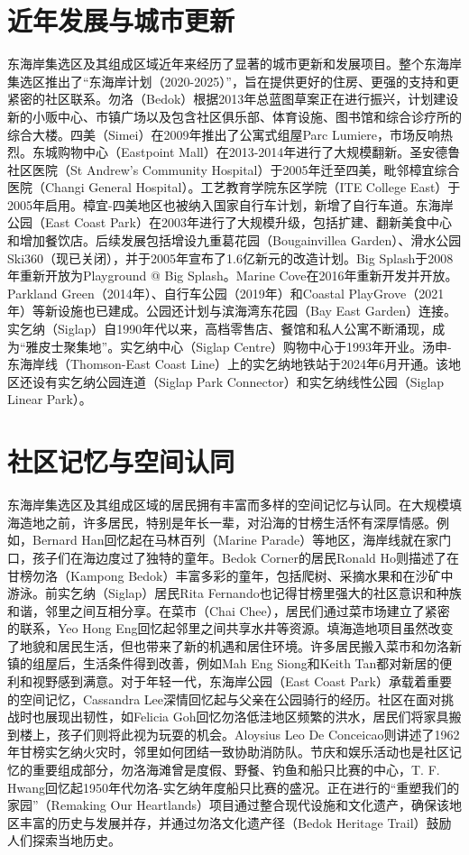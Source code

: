 \documentclass[11pt,a4paper,twoside,openany]{book}
\begin{document}
\section{近年发展与城市更新}
东海岸集选区及其组成区域近年来经历了显著的城市更新和发展项目。整个东海岸集选区推出了“东海岸计划（2020-2025）”，旨在提供更好的住房、更强的支持和更紧密的社区联系。勿洛（Bedok）根据2013年总蓝图草案正在进行振兴，计划建设新的小贩中心、市镇广场以及包含社区俱乐部、体育设施、图书馆和综合诊疗所的综合大楼。四美（Simei）在2009年推出了公寓式组屋Parc Lumiere，市场反响热烈。东城购物中心（Eastpoint Mall）在2013-2014年进行了大规模翻新。圣安德鲁社区医院（St Andrew’s Community Hospital）于2005年迁至四美，毗邻樟宜综合医院（Changi General Hospital）。工艺教育学院东区学院（ITE College East）于2005年启用。樟宜-四美地区也被纳入国家自行车计划，新增了自行车道。东海岸公园（East Coast Park）在2003年进行了大规模升级，包括扩建、翻新美食中心和增加餐饮店。后续发展包括增设九重葛花园（Bougainvillea Garden）、滑水公园Ski360（现已关闭），并于2005年宣布了1.6亿新元的改造计划。Big Splash于2008年重新开放为Playground @ Big Splash。Marine Cove在2016年重新开发并开放。Parkland Green（2014年）、自行车公园（2019年）和Coastal PlayGrove（2021年）等新设施也已建成。公园还计划与滨海湾东花园（Bay East Garden）连接。实乞纳（Siglap）自1990年代以来，高档零售店、餐馆和私人公寓不断涌现，成为“雅皮士聚集地”。实乞纳中心（Siglap Centre）购物中心于1993年开业。汤申-东海岸线（Thomson-East Coast Line）上的实乞纳地铁站于2024年6月开通。该地区还设有实乞纳公园连道（Siglap Park Connector）和实乞纳线性公园（Siglap Linear Park）。

\section{社区记忆与空间认同}
东海岸集选区及其组成区域的居民拥有丰富而多样的空间记忆与认同。在大规模填海造地之前，许多居民，特别是年长一辈，对沿海的甘榜生活怀有深厚情感。例如，Bernard Han回忆起在马林百列（Marine Parade）等地区，海岸线就在家门口，孩子们在海边度过了独特的童年。Bedok Corner的居民Ronald Ho则描述了在甘榜勿洛（Kampong Bedok）丰富多彩的童年，包括爬树、采摘水果和在沙矿中游泳。前实乞纳（Siglap）居民Rita Fernando也记得甘榜里强大的社区意识和种族和谐，邻里之间互相分享。在菜市（Chai Chee），居民们通过菜市场建立了紧密的联系，Yeo Hong Eng回忆起邻里之间共享水井等资源。填海造地项目虽然改变了地貌和居民生活，但也带来了新的机遇和居住环境。许多居民搬入菜市和勿洛新镇的组屋后，生活条件得到改善，例如Mah Eng Siong和Keith Tan都对新居的便利和视野感到满意。对于年轻一代，东海岸公园（East Coast Park）承载着重要的空间记忆，Cassandra Lee深情回忆起与父亲在公园骑行的经历。社区在面对挑战时也展现出韧性，如Felicia Goh回忆勿洛低洼地区频繁的洪水，居民们将家具搬到楼上，孩子们则将此视为玩耍的机会。Aloysius Leo De Conceicao则讲述了1962年甘榜实乞纳火灾时，邻里如何团结一致协助消防队。节庆和娱乐活动也是社区记忆的重要组成部分，勿洛海滩曾是度假、野餐、钓鱼和船只比赛的中心，T. F. Hwang回忆起1950年代勿洛-实乞纳年度船只比赛的盛况。正在进行的“重塑我们的家园”（Remaking Our Heartlands）项目通过整合现代设施和文化遗产，确保该地区丰富的历史与发展并存，并通过勿洛文化遗产径（Bedok Heritage Trail）鼓励人们探索当地历史。
\end{document}
